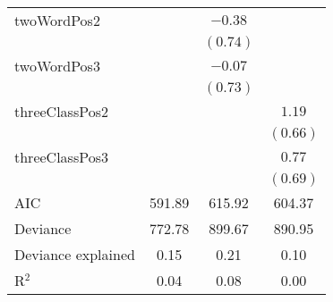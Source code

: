 \begin{table}[!h]
\begin{center}
{\begin{tabular}{l c c c }
twoWordPos2               &              & $-0.38$      &            \\
                          &              & $(0.74)$     &            \\
twoWordPos3               &              & $-0.07$      &            \\
                          &              & $(0.73)$     &            \\
threeClassPos2            &              &              & $1.19$     \\
                          &              &              & $(0.66)$   \\
threeClassPos3            &              &              & $0.77$     \\
                          &              &              & $(0.69)$   \\
\hline
AIC                       & 591.89       & 615.92       & 604.37     \\
Deviance                  & 772.78       & 899.67       & 890.95     \\
Deviance explained        & 0.15         & 0.21         & 0.10       \\
R$^2$                     & 0.04         & 0.08         & 0.00       \\

\end{tabular}}
\end{center}
\end{table}
